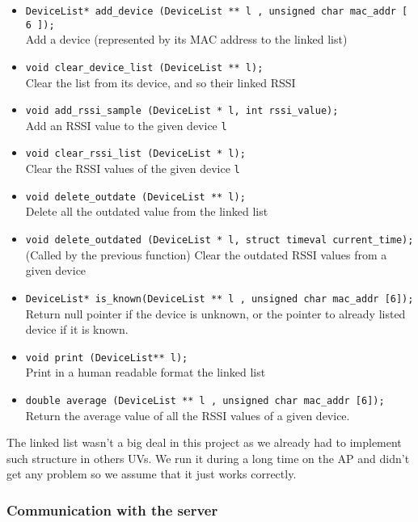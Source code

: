 \begin{itemize}
    \item \verb+DeviceList* add_device (DeviceList ** l , unsigned char mac_addr [ 6 ]);+\\
        Add a device (represented by its MAC address to the linked list)
    \item \verb+void clear_device_list (DeviceList ** l);+\\
        Clear the list from its device, and so their linked RSSI 
    \item \verb+void add_rssi_sample (DeviceList * l, int rssi_value);+\\
        Add an RSSI value to the given device \verb+l+
    \item \verb+void clear_rssi_list (DeviceList * l);+\\
        Clear the RSSI values of the given device \verb+l+
    \item \verb+void delete_outdate (DeviceList ** l);+\\
        Delete all the outdated value from the linked list
    \item \verb+void delete_outdated (DeviceList * l, struct timeval current_time);+\\
        (Called by the previous function) Clear the outdated RSSI values from a
        given device
    \item \verb+DeviceList* is_known(DeviceList ** l , unsigned char mac_addr [6]);+\\
        Return null pointer if the device is unknown, or the pointer to already
        listed device if it is known. 
    \item \verb+void print (DeviceList** l);+\\
        Print in a human readable format the linked list
    \item \verb+double average (DeviceList ** l , unsigned char mac_addr [6]);+\\
        Return the average value of all the RSSI values of a given device.
\end{itemize}

The linked list wasn't a big deal in this project as we already had to
implement such structure in others UVs. We run it during a long time on the AP
and didn't get any problem so we assume that it just works correctly. 

\subsubsection{Communication with the server}

